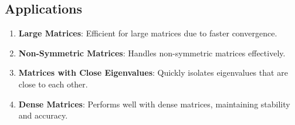 \documentclass[journal]{IEEEtran}
\begin{document}
\subsection*{Applications}
\begin{enumerate}[label=\textbullet]
    \item \textbf{Large Matrices}: Efficient for large matrices due to faster convergence.
    \item \textbf{Non-Symmetric Matrices}: Handles non-symmetric matrices effectively.
    \item \textbf{Matrices with Close Eigenvalues}: Quickly isolates eigenvalues that are close to each other.
     \item \textbf{Dense Matrices}: Performs well with dense matrices, maintaining stability and accuracy.
\end{enumerate}
\end{document}

